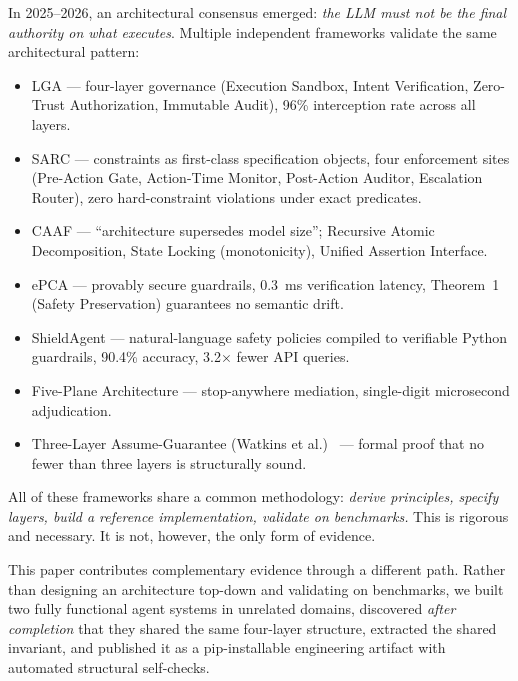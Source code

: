 \documentclass[letterpaper]{article}
\begin{document}
In 2025--2026, an architectural consensus emerged: \textit{the LLM must not be
the final authority on what executes}.  Multiple independent frameworks
validate the same architectural pattern:

\begin{itemize}
\item LGA \cite{ge2026} --- four-layer governance (Execution Sandbox, Intent
      Verification, Zero-Trust Authorization, Immutable Audit), 96\%
      interception rate across all layers.
\item SARC \cite{besanson2026} --- constraints as first-class specification
      objects, four enforcement sites (Pre-Action Gate, Action-Time Monitor,
      Post-Action Auditor, Escalation Router), zero hard-constraint violations
      under exact predicates.
\item CAAF \cite{li2026} --- ``architecture supersedes model size''; Recursive
      Atomic Decomposition, State Locking (monotonicity), Unified Assertion
      Interface.
\item ePCA \cite{yang2026} --- provably secure guardrails, 0.3~ms verification
      latency, Theorem~1 (Safety Preservation) guarantees no semantic drift.
\item ShieldAgent \cite{zhao2025} --- natural-language safety policies compiled
      to verifiable Python guardrails, 90.4\% accuracy, 3.2$\times$ fewer API
      queries.
\item Five-Plane Architecture \cite{tallam2026} --- stop-anywhere mediation,
      single-digit microsecond adjudication.
\item Three-Layer Assume-Guarantee (Watkins et al.)~\cite{watkins2026} ---
      formal proof that no fewer than three layers is structurally sound.
\end{itemize}

All of these frameworks share a common methodology: \textit{derive principles,
specify layers, build a reference implementation, validate on benchmarks.}
This is rigorous and necessary.  It is not, however, the only form of evidence.

This paper contributes complementary evidence through a different path.
Rather than designing an architecture top-down and validating on benchmarks, we
built two fully functional agent systems in unrelated domains, discovered
\textit{after completion} that they shared the same four-layer structure,
extracted the shared invariant, and published it as a pip-installable
engineering artifact with automated structural self-checks.
\end{document}
